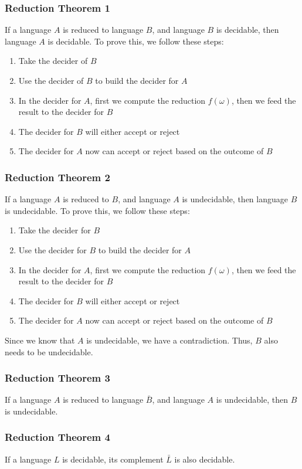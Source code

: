 \documentclass{article}
\begin{document}
\subsubsection{Reduction Theorem 1}
If a language $A$ is reduced to language $B$, and language $B$ is decidable, then language $A$ is decidable. To prove this, we follow these steps:

\begin{enumerate}
	\item Take the decider of $B$
	\item Use the decider of $B$ to build the decider for $A$
	\item In the decider for $A$, first we compute the reduction $f(\omega)$, then we feed the result to the decider for $B$
	\item The decider for $B$ will either accept or reject
	\item The decider for $A$ now can accept or reject based on the outcome of $B$ 
\end{enumerate}

\subsubsection{Reduction Theorem 2}
If a language $A$ is reduced to $B$, and language $A$ is undecidable, then language $B$ is undecidable. To prove this, we follow these steps:
\begin{enumerate}
	\item Take the decider for $B$
	\item Use the decider for $B$ to build the decider for $A$
	\item In the decider for $A$, first we compute the reduction $f(\omega)$, then we feed the result to the decider for $B$
	\item The decider for $B$ will either accept or reject
	\item The decider for $A$ now can accept or reject based on the outcome of $B$
\end{enumerate}
Since we know that $A$ is undecidable, we have a contradiction. Thus, $B$ also needs to be undecidable.

\subsubsection{Reduction Theorem 3}
If a language $A$ is reduced to language $\bar B$, and language $A$ is undecidable, then $B$ is undecidable.

\subsubsection{Reduction Theorem 4}
If a language $L$ is decidable, its complement $\bar L$ is also decidable.
\end{document}
